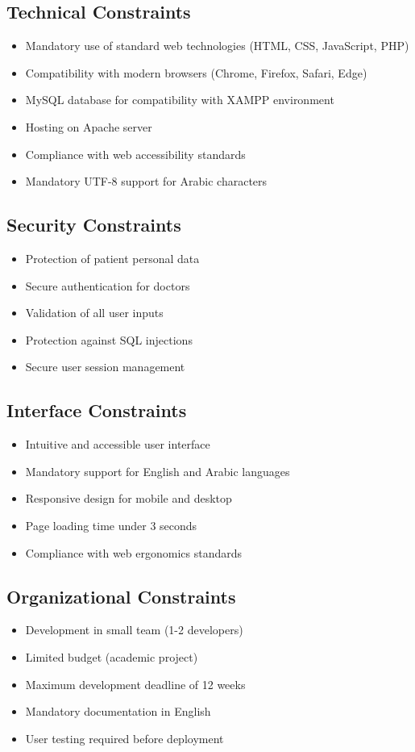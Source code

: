 \documentclass[12pt,a4paper]{report}
\begin{document}
\subsection{Technical Constraints}
\begin{itemize}
    \item Mandatory use of standard web technologies (HTML, CSS, JavaScript, PHP)
    \item Compatibility with modern browsers (Chrome, Firefox, Safari, Edge)
    \item MySQL database for compatibility with XAMPP environment
    \item Hosting on Apache server
    \item Compliance with web accessibility standards
    \item Mandatory UTF-8 support for Arabic characters
\end{itemize}

\subsection{Security Constraints}
\begin{itemize}
    \item Protection of patient personal data
    \item Secure authentication for doctors
    \item Validation of all user inputs
    \item Protection against SQL injections
    \item Secure user session management
\end{itemize}

\subsection{Interface Constraints}
\begin{itemize}
    \item Intuitive and accessible user interface
    \item Mandatory support for English and Arabic languages
    \item Responsive design for mobile and desktop
    \item Page loading time under 3 seconds
    \item Compliance with web ergonomics standards
\end{itemize}

\subsection{Organizational Constraints}
\begin{itemize}
    \item Development in small team (1-2 developers)
    \item Limited budget (academic project)
    \item Maximum development deadline of 12 weeks
    \item Mandatory documentation in English
    \item User testing required before deployment
\end{itemize}
\end{document}

